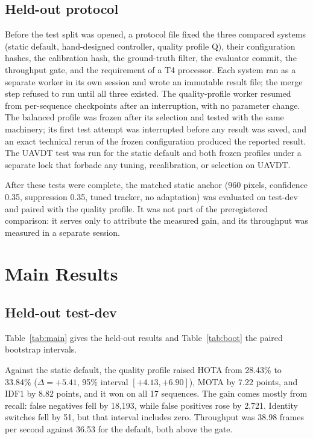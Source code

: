 \documentclass[journal]{new-aiaa}
\begin{document}
\subsection{Held-out protocol}
Before the test split was opened, a protocol file fixed the three compared systems (static default, hand-designed controller, quality profile Q), their configuration hashes, the calibration hash, the ground-truth filter, the evaluator commit, the throughput gate, and the requirement of a T4 processor. Each system ran as a separate worker in its own session and wrote an immutable result file; the merge step refused to run until all three existed. The quality-profile worker resumed from per-sequence checkpoints after an interruption, with no parameter change. The balanced profile was frozen after its selection and tested with the same machinery; its first test attempt was interrupted before any result was saved, and an exact technical rerun of the frozen configuration produced the reported result. The UAVDT test was run for the static default and both frozen profiles under a separate lock that forbade any tuning, recalibration, or selection on UAVDT.

After these tests were complete, the matched static anchor (960 pixels, confidence 0.35, suppression 0.35, tuned tracker, no adaptation) was evaluated on test-dev and paired with the quality profile. It was not part of the preregistered comparison: it serves only to attribute the measured gain, and its throughput was measured in a separate session.

\section{Main Results}\label{sec:results}

\subsection{Held-out test-dev}
Table~\ref{tab:main} gives the held-out results and Table~\ref{tab:boot} the paired bootstrap intervals.





Against the static default, the quality profile raised HOTA from 28.43\% to 33.84\% ($\Delta=+5.41$, 95\% interval $[+4.13, +6.90]$), MOTA by 7.22 points, and IDF1 by 8.82 points, and it won on all 17 sequences. The gain comes mostly from recall: false negatives fell by 18,193, while false positives rose by 2,721. Identity switches fell by 51, but that interval includes zero. Throughput was 38.98 frames per second against 36.53 for the default, both above the gate.
\end{document}
